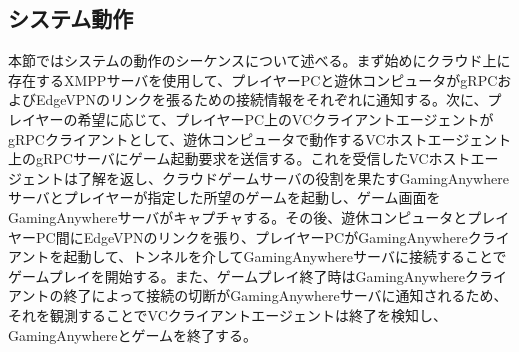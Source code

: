 \subsection{システム動作}
本節ではシステムの動作のシーケンスについて述べる。まず始めにクラウド上に存在するXMPPサーバを使用して、プレイヤーPCと遊休コンピュータがgRPCおよびEdgeVPNのリンクを張るための接続情報をそれぞれに通知する。次に、プレイヤーの希望に応じて、プレイヤーPC上のVCクライアントエージェントがgRPCクライアントとして、遊休コンピュータで動作するVCホストエージェント上のgRPCサーバにゲーム起動要求を送信する。これを受信したVCホストエージェントは了解を返し、クラウドゲームサーバの役割を果たすGamingAnywhereサーバとプレイヤーが指定した所望のゲームを起動し、ゲーム画面をGamingAnywhereサーバがキャプチャする。その後、遊休コンピュータとプレイヤーPC間にEdgeVPNのリンクを張り、プレイヤーPCがGamingAnywhereクライアントを起動して、トンネルを介してGamingAnywhereサーバに接続することでゲームプレイを開始する。また、ゲームプレイ終了時はGamingAnywhereクライアントの終了によって接続の切断がGamingAnywhereサーバに通知されるため、それを観測することでVCクライアントエージェントは終了を検知し、GamingAnywhereとゲームを終了する。
